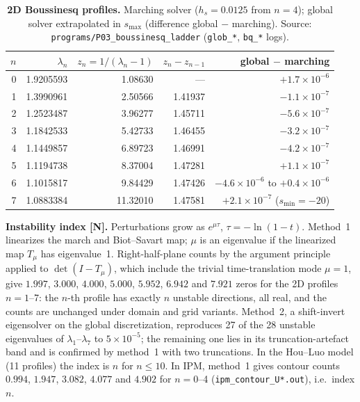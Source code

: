 \documentclass[10pt]{article}
\begin{document}
\begin{table}[h]
\centering
\caption{\textbf{2D Boussinesq profiles.} Marching solver ($h_s=0.0125$ from $n=4$); global solver extrapolated in
$s_{\max}$ (difference global $-$ marching). Source: \texttt{programs/P03\_boussinesq\_ladder} (\texttt{glob\_*},
\texttt{bq\_*} logs).}
\label{tab:bq}
\small
\begin{tabular}{rrrrr}
\toprule
$n$ & $\lambda_n$ & $z_n=1/(\lambda_n-1)$ & $z_n-z_{n-1}$ & global $-$ marching\\
\midrule
0 & 1.9205593 & 1.08630 & --- & $+1.7\times10^{-6}$\\
1 & 1.3990961 & 2.50566 & 1.41937 & $-1.1\times10^{-7}$\\
2 & 1.2523487 & 3.96277 & 1.45711 & $-5.6\times10^{-7}$\\
3 & 1.1842533 & 5.42733 & 1.46455 & $-3.2\times10^{-7}$\\
4 & 1.1449857 & 6.89723 & 1.46991 & $-4.2\times10^{-7}$\\
5 & 1.1194738 & 8.37004 & 1.47281 & $+1.1\times10^{-7}$\\
6 & 1.1015817 & 9.84429 & 1.47426 & $-4.6\times10^{-6}$ to $+0.4\times10^{-6}$\\
7 & 1.0883384 & 11.32010 & 1.47581 & $+2.1\times10^{-7}$ ($s_{\min}=-20$)\\
\bottomrule
\end{tabular}
\end{table}

\textbf{Instability index [N].} Perturbations grow as $e^{\mu\tau}$, $\tau=-\ln(1-t)$. Method~1 linearizes the march
and Biot--Savart map; $\mu$ is an eigenvalue if the linearized map $T_\mu$ has eigenvalue~1. Right-half-plane counts
by the argument principle applied to $\det(I-T_\mu)$, which include the trivial time-translation mode $\mu=1$, give
$1.997$, $3.000$, $4.000$, $5.000$, $5.952$, $6.942$ and $7.921$ zeros for the 2D profiles $n=1$--7: the $n$-th
profile has exactly $n$ unstable directions, all real, and the counts are unchanged under domain and grid variants.
Method~2, a shift-invert eigensolver on the global discretization, reproduces 27 of the 28 unstable eigenvalues of
$\lambda_1$--$\lambda_7$ to $5\times10^{-5}$; the remaining one lies in its truncation-artefact band and is confirmed
by method~1 with two truncations. In the Hou--Luo model (11 profiles) the index is $n$ for $n\le10$. In IPM, method~1
gives contour counts $0.994$, $1.947$, $3.082$, $4.077$ and $4.902$ for $n=0$--4 (\texttt{ipm\_contour\_U*.out}),
i.e.\ index $n$.
\end{document}
